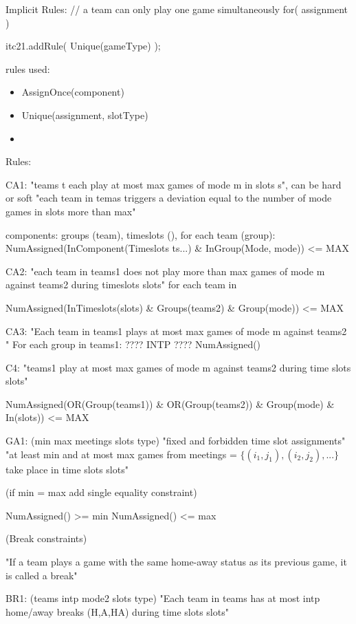 Implicit Rules:
// a team can only play one game simultaneously
for( assignment ){
	itc21.addRule( Unique(gameType) );


rules used:
\begin{itemize}
	\item AssignOnce(component)
	\item Unique(assignment, slotType)
	\item 
\end{itemize}








Rules:

CA1: "teams t each play at most max games of mode m in slots s", can be hard or soft
"each team in temas triggers a deviation equal to the number of mode games in slots more than max"

components: groups (team), timeslots (),
for each team (group):
NumAssigned(InComponent(Timeslots ts...) \& InGroup(Mode, mode)) <= MAX

CA2: "each team in teams1 does not play more than max games of mode m against teams2 during timeslots slots"
for each team in 

NumAssigned(InTimeslots(slots) \& Groups(teams2) \& Group(mode)) <= MAX

CA3: "Each team in teams1 plays at most max games of mode m against teams2 "
For each group in teams1:
???? INTP ????
NumAssigned()

C4: "teams1 play at most max games of mode m against teams2 during time slots slots"

NumAssigned(OR(Group(teams1)) \& OR(Group(teams2)) \& Group(mode) \& In(slots)) <= MAX

GA1: (min max meetings slots type) "fixed and forbidden time slot assignments" "at least min and at most max games from meetings = $\{(i_1,j_1),(i_2,j_2),...\}$ take place in time slots slots"

(if min = max add single equality constraint)

NumAssigned() >= min
NumAssigned() <= max

(Break constraints)

"If a team plays a game with the same home-away status as its previous game, it is called a break"

BR1: (teams intp mode2 slots type)
"Each team in teams has at most intp home/away breaks (H,A,HA) during time slots slots" 

}
